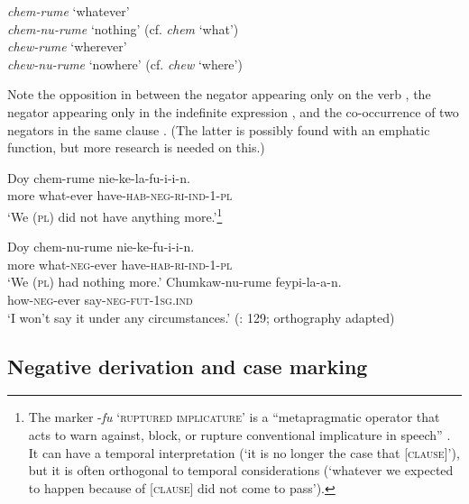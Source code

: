 \documentclass[output=paper,colorlinks,citecolor=brown,draft]{langscibook}
\begin{document}
    \ex\label{ex:mapu:22b}
        \gll \textit{chem-rume} ‘whatever’ \\
             \textit{chem-nu-rume} ‘nothing’  (cf. \textit{chem} ‘what’) \\

    \ex\label{ex:mapu:22c}
        \gll \textit{chew-rume} ‘wherever’ \\
             \textit{chew-nu-rume} ‘nowhere’  (cf. \textit{chew} ‘where’) \\
    \z
\z 
 
Note the opposition in  between the negator appearing only on the verb , the negator appearing only in the indefinite expression , and the co-occurrence of two negators in the same clause . (The latter is possibly found with an emphatic function, but more research is needed on this.)

\ea\label{ex:mapu:23}
    \ea\label{ex:mapu:23a}
        \gll Doy  chem-rume  nie-ke-la-fu-i-i-n. \\ 
             more  what-ever  have-\textsc{hab-neg-ri-ind-1-pl} \\
        \glt ‘We (\textsc{pl}) did not have anything more.’\footnote{The marker -\textit{fu} ‘\textsc{ruptured} \textsc{implicature}’ is a “metapragmatic operator that acts to warn against, block, or rupture conventional implicature in speech” \citep[240]{Golluscio2000}. It can have a temporal interpretation (‘it is no longer the case that [\textsc{clause}]’), but it is often orthogonal to temporal considerations (‘whatever we expected to happen because of [\textsc{clause}] did not come to pass’).} \citep[244]{Smeets2008}
    
    \ex\label{ex:mapu:23b}
        \gll Doy  chem-nu-rume  nie-ke-fu-i-i-n. \\
             more  what-\textsc{neg-}ever  have-\textsc{hab-ri-ind-1-pl}\\
        \glt ‘We (\textsc{pl}) had nothing more.’ \citep[244]{Smeets2008}
        \ex\label{ex:mapu:23c}
        \gll Chumkaw-nu-rume    feypi-la-a-n. \\
             how-\textsc{neg}{}-ever    say-\textsc{neg-fut-1sg.ind} \\
        \glt ‘I won’t say it under any circumstances.’ (\citealt{Catrileo2010}: 129; orthography adapted)
    \z
\z 
 
 \subsection{Negative derivation and case marking}
\end{document}
